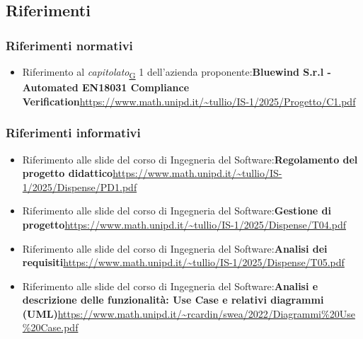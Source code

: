 ﻿\documentclass[a4paper,12pt]{article}
\begin{document}
{  \subsection{Riferimenti}{
      \subsubsection{Riferimenti normativi}{
          \begin{itemize}
              \item Riferimento al \textit{capitolato}\textsubscript{\href{https://atlasteam9.github.io/Atlas/glossario.html\#Capitolato}{G}} 1 dell'azienda proponente:\newline \textbf{Bluewind S.r.l - Automated EN18031 Compliance Verification}\newline \url{https://www.math.unipd.it/~tullio/IS-1/2025/Progetto/C1.pdf}
          \end{itemize}
      }

      \subsubsection{Riferimenti informativi}{
          \begin{itemize}
              \item Riferimento alle slide del corso di Ingegneria del Software:\newline \textbf{Regolamento del progetto didattico}\newline \url{https://www.math.unipd.it/~tullio/IS-1/2025/Dispense/PD1.pdf}
              \item Riferimento alle slide del corso di Ingegneria del Software:\newline \textbf{Gestione di progetto}\newline \url{https://www.math.unipd.it/~tullio/IS-1/2025/Dispense/T04.pdf}
              \item Riferimento alle slide del corso di Ingegneria del Software:\newline \textbf{Analisi dei requisiti}\newline \url{https://www.math.unipd.it/~tullio/IS-1/2025/Dispense/T05.pdf}
              \item Riferimento alle slide del corso di Ingegneria del Software:\newline \textbf{Analisi e descrizione delle funzionalità: Use Case e relativi diagrammi (UML)}\newline \url{https://www.math.unipd.it/~rcardin/swea/2022/Diagrammi%20Use%20Case.pdf} 
          \end{itemize}
      }
  }
 }
\end{document}
